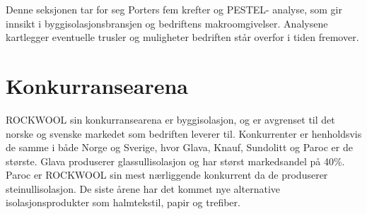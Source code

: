 Denne seksjonen tar for seg Porters fem krefter og PESTEL- analyse, som gir innsikt i byggisolasjonsbransjen og bedriftens makroomgivelser. Analysene kartlegger eventuelle trusler og muligheter bedriften står overfor i tiden fremover.

\section{Konkurransearena}
ROCKWOOL sin konkurransearena er byggisolasjon, og er avgrenset til det norske og svenske markedet som bedriften leverer til.  Konkurrenter er henholdsvis de samme i både Norge og Sverige, hvor Glava, Knauf, Sundolitt og Paroc er de største. Glava produserer glassullisolasjon og har størst markedsandel på 40\%. Paroc er ROCKWOOL sin mest nærliggende konkurrent da de produserer steinullisolasjon. De siste årene har det kommet nye alternative isolasjonsprodukter som halmtekstil, papir og trefiber.

